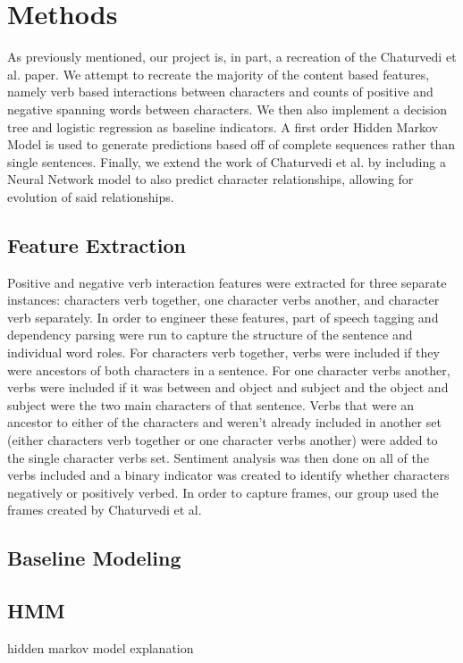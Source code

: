 \documentclass[11pt,a4paper]{article}
\begin{document}
\section{Methods}
As previously mentioned, our project is, in part, a recreation of the Chaturvedi et al. paper. We attempt to recreate the majority of the content based features, namely verb based interactions between characters and counts of positive and negative spanning words between characters. We then also implement a decision tree and logistic regression as baseline indicators. A first order Hidden Markov Model is used to generate predictions based off of complete sequences rather than single sentences. Finally, we extend the work of Chaturvedi et al. by including a Neural Network model to also predict character relationships, allowing for evolution of said relationships.

\subsection{Feature Extraction}
Positive and negative verb interaction features were extracted for three separate instances: characters verb together, one character verbs another, and character verb separately. In order to engineer these features, part of speech tagging and dependency parsing were run to capture the structure of the sentence and individual word roles. For characters verb together, verbs were included if they were ancestors of both characters in a sentence. For one character verbs another, verbs were included if it was between and object and subject and the object and subject were the two main characters of that sentence. Verbs that were an ancestor to either of the characters and weren't already included in another set (either characters verb together or one character verbs another) were added to the single character verbs set. Sentiment analysis was then done on all of the verbs included and a binary indicator was created to identify whether characters negatively or positively verbed. 
In order to capture frames, our group used the frames created by Chaturvedi et al.

\subsection{Baseline Modeling}



\subsection{HMM}
hidden markov model explanation 
\end{document}

